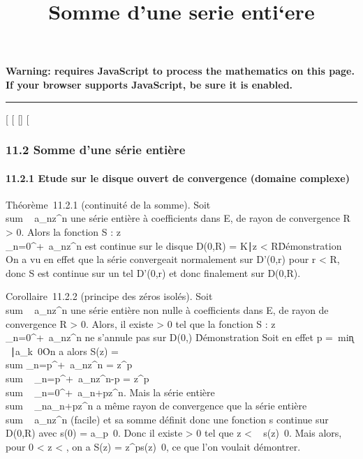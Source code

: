 \documentclass[]{article}
\title{Somme d'une serie enti`ere}
\author{}
\date{}
\begin{document}
\maketitle

\textbf{Warning: 
requires JavaScript to process the mathematics on this page.\\ If your
browser supports JavaScript, be sure it is enabled.}

\begin{center}\rule{3in}{0.4pt}\end{center}

{[}
{[}
{[}{]}
{[}

\subsubsection{11.2 Somme d'une série entière}

\paragraph{11.2.1 Etude sur le disque ouvert de convergence (domaine
complexe)}

Théorème~11.2.1 (continuité de la somme). Soit
\\sum ~
a\_nz^n une série entière à coefficients dans E, de
rayon de convergence R \textgreater{} 0. Alors la fonction S :
z\mapsto~\\\sum
 \_n=0^+\infty~a\_nz^n est continue sur le
disque D(0,R) = \z \in
K∣\textbar{}z\textbar{} \textless{}
R\.

Démonstration On a vu en effet que la série convergeait normalement sur
D'(0,r) pour r \textless{} R, donc S est continue sur un tel D'(0,r) et
donc finalement sur D(0,R).

Corollaire~11.2.2 (principe des zéros isolés). Soit
\\sum ~
a\_nz^n une série entière non nulle à coefficients
dans E, de rayon de convergence R \textgreater{} 0. Alors, il existe \eta
\textgreater{} 0 tel que la fonction S :
z\mapsto~\\\sum
 \_n=0^+\infty~a\_nz^n ne s'annule pas sur
D(0,\eta) \diagdown\0\.

Démonstration Soit en effet p =\
min\k \in
{}~∣a\_k\mathrel\neq~0\.
On a alors S(z) =\ \\sum
 \_n=p^+\infty~a\_nz^n =
z^p \\sum ~
\_n=p^+\infty~a\_nz^n-p =
z^p \\sum ~
\_n=0^+\infty~a\_n+pz^n. Mais la série entière
\\sum ~
\_na\_n+pz^n a même rayon de convergence que la
série entière \\sum ~
a\_nz^n (facile) et sa somme définit donc une
fonction s continue sur D(0,R) avec s(0) =
a\_p\neq~0. Donc il existe \eta
\textgreater{} 0 tel que \textbar{}z\textbar{} \textless{} \eta \rigtharrow~
s(z)\neq~0. Mais alors, pour 0 \textless{}
\textbar{}z\textbar{} \textless{} \eta, on a S(z) =
z^ps(z)\neq~0, ce que l'on voulait
démontrer.
\end{document}
